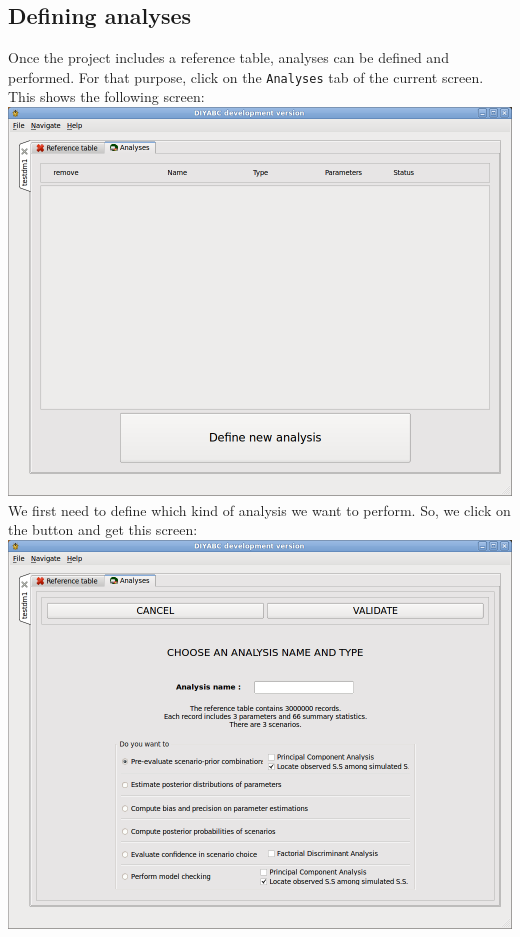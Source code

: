\subsection{Defining analyses}
Once the project includes a reference table, analyses can be defined and performed. For that purpose, click on the \texttt{Analyses} tab of the current screen. This shows the following screen:\\
 
\includegraphics[scale=0.36]{gui_pictures/Capture-DIYABC-30.png} 
 \vspace{20}
We first need to define which kind of analysis we want to perform. So, we click on the  button and get this screen:\\ 
\includegraphics[scale=0.36]{gui_pictures/Capture-DIYABC-31.png} 
